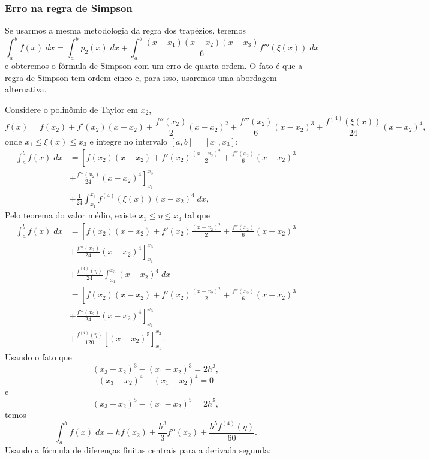 \subsubsection{Erro na regra de Simpson}
Se usarmos a mesma metodologia da regra dos trapézios, teremos
$$
\int_a^bf(x)\;dx=\int_a^bp_2(x)\;dx+\int_a^b\frac{(x-x_1)(x-x_2)(x-x_3)}{6}f'''(\xi(x))\;dx
$$
e obteremos o fórmula de Simpson com um erro de quarta ordem. O fato é que a regra de Simpson tem ordem cinco e, para isso, usaremos uma abordagem alternativa.

Considere o polinômio de Taylor em $x_2$,
$$
f(x)=f(x_2)+f'(x_2)(x-x_2)+\frac{f''(x_2)}{2}(x-x_2)^2+\frac{f'''(x_2)}{6}(x-x_2)^3+\frac{f^{(4)}(\xi(x))}{24}(x-x_2)^4,
$$
onde $x_1\leq\xi(x)\leq x_3$ e integre no intervalo $[a,b]=[x_1,x_3]$:
\begin{equation*}
  \begin{split}
    \int_a^bf(x)\;dx&= \left[f(x_2)(x-x_2)+f'(x_2)\frac{(x-x_2)^2}{2} + \frac{f''(x_2)}{6}(x-x_2)^3\right. \\
      &\left. + \frac{f'''(x_2)}{24}(x-x_2)^4\right]_{x_1}^{x_3}\\
      &+ \frac{1}{24}\int_{x_1}^{x_3}f^{(4)}(\xi(x))(x-x_2)^4\;dx,
  \end{split}
\end{equation*}
Pelo teorema do valor médio, existe $x_1\leq\eta\leq x_3$ tal que
\begin{equation*}
  \begin{split}
    \int_a^bf(x)\;dx&= \left[f(x_2)(x-x_2)+f'(x_2)\frac{(x-x_2)^2}{2}+\frac{f''(x_2)}{6}(x-x_2)^3\right.\\
    &+\left.\frac{f'''(x_2)}{24}(x-x_2)^4\right]_{x_1}^{x_3}\\
    &+ \frac{f^{(4)}(\eta)}{24}\int_{x_1}^{x_3}(x-x_2)^4\;dx\\
    &= \left[f(x_2)(x-x_2)+f'(x_2)\frac{(x-x_2)^2}{2}+\frac{f''(x_2)}{6}(x-x_2)^3\right.\\
    &+\left.\frac{f'''(x_2)}{24}(x-x_2)^4\right]_{x_1}^{x_3}\\
    &+ \frac{f^{(4)}(\eta)}{120}\left[(x-x_2)^5\right]_{x_1}^{x_3}.
  \end{split}
\end{equation*}
Usando o fato que
$$
(x_3-x_2)^3-(x_1-x_2)^3=2h^3,
$$
$$
(x_3-x_2)^4-(x_1-x_2)^4=0
$$
e
$$
(x_3-x_2)^5-(x_1-x_2)^5=2h^5,
$$
temos
$$
\int_a^bf(x)\;dx=hf(x_2)+\frac{h^3}{3}f''(x_2)+\frac{h^5f^{(4)}(\eta)}{60}.
$$
Usando a fórmula de diferenças finitas centrais para a derivada segunda:
